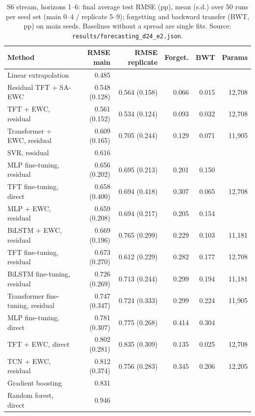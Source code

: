 \begin{table}[t]
  \centering
  \caption{S6 stream, horizons 1--6: final average test RMSE (pp), mean (s.d.) over 50 runs per seed set (main 0--4 / replicate 5--9); forgetting and backward transfer (BWT, pp) on main seeds. Baselines without a spread are single fits. Source: \texttt{results/forecasting\_d24\_e2.json}.}
  \label{tab:d24-comparison-e2}
  \setlength{\tabcolsep}{3pt}
  \scriptsize
  \begin{tabular}{lrrrrr}
    \toprule
    Method & RMSE main & RMSE replicate & Forget. & BWT & Params \\
    \midrule
    Linear extrapolation & 0.485 &  &  &  &  \\
    Residual TFT + SA-EWC & 0.548 (0.128) & 0.564 (0.158) & 0.066 & 0.015 & 12,708 \\
    TFT + EWC, residual & 0.561 (0.152) & 0.534 (0.124) & 0.093 & 0.032 & 12,708 \\
    Transformer + EWC, residual & 0.609 (0.165) & 0.705 (0.244) & 0.129 & 0.071 & 11,905 \\
    SVR, residual & 0.616 &  &  &  &  \\
    MLP fine-tuning, residual & 0.656 (0.202) & 0.695 (0.213) & 0.201 & 0.150 &  \\
    TFT fine-tuning, direct & 0.658 (0.400) & 0.694 (0.418) & 0.307 & 0.065 & 12,708 \\
    MLP + EWC, residual & 0.659 (0.208) & 0.694 (0.217) & 0.205 & 0.154 &  \\
    BiLSTM + EWC, residual & 0.669 (0.196) & 0.765 (0.299) & 0.229 & 0.103 & 11,181 \\
    TFT fine-tuning, residual & 0.673 (0.270) & 0.612 (0.229) & 0.282 & 0.177 & 12,708 \\
    BiLSTM fine-tuning, residual & 0.726 (0.269) & 0.713 (0.244) & 0.299 & 0.194 & 11,181 \\
    Transformer fine-tuning, residual & 0.747 (0.347) & 0.724 (0.333) & 0.299 & 0.224 & 11,905 \\
    MLP fine-tuning, direct & 0.781 (0.307) & 0.775 (0.268) & 0.414 & 0.304 &  \\
    TFT + EWC, direct & 0.802 (0.281) & 0.835 (0.309) & 0.135 & 0.025 & 12,708 \\
    TCN + EWC, residual & 0.812 (0.374) & 0.756 (0.283) & 0.345 & 0.206 & 12,205 \\
    Gradient boosting & 0.831 &  &  &  &  \\
    Random forest, direct & 0.946 &  &  &  &  \\

\end{tabular}
\end{table}
